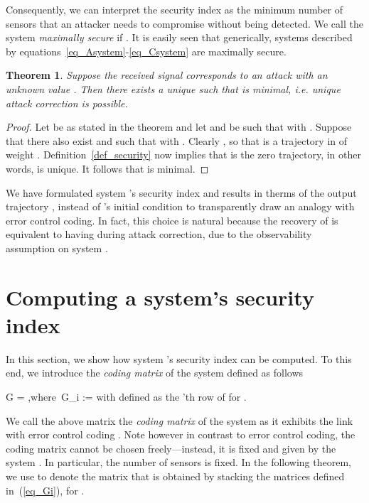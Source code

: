 \documentclass[letterpaper, 10 pt, conference]{ieeeconf}
\newcommand{\beq}{}
\newcommand{\bmat}{\left[ \begin{array}}
\newcommand{\emat}{\end{array} \right]}
\newtheorem{thm}{Theorem}[section]
\begin{document}
Consequently, we can interpret the security index  as the minimum number of sensors that an attacker needs to compromise without being detected. We call the system  {\em maximally secure} if . It is easily seen that generically, systems described by equations~\eqref{eq_Asystem}-\eqref{eq_Csystem} are maximally secure.

\begin{thm}\label{thm_correct}
Suppose the received signal  corresponds to an attack  with  an unknown value . Then there exists a unique  such that  is minimal, i.e. unique attack correction is possible.   
\end{thm}
\begin{proof}
		Let  be as stated in the theorem and let  and  be such that  with . Suppose that there also exist  and  such that  with . Clearly , so that  is a trajectory in  of weight . Definition~\ref{def_security} now implies that 
		 is the zero trajectory, in other words,  is unique.  It follows that  is minimal.
\end{proof}

We have formulated system 's security index  and results in therms of the output trajectory , instead of 's initial condition  to transparently draw an analogy with error control coding. In fact, this choice is natural because the recovery of  is equivalent to having  during attack correction, due to the observability assumption on system .

\section{Computing a system's security index}
In this section, we show how system 's security index  can be computed. To this end, we introduce the {\em coding matrix}  of the system  defined as follows 
\beq
G = \bmat{c} G_1 \\ G_2 \\ \vdots \\ G_N \emat,\;\;\;\mbox{where }G_i := \bmat{c} C_i \\
C_iA
\\
C_iA^2 \\
\vdots \\
C_iA^{n-1}
\emat\label{eq_Gi}
\eeq
with  defined as the 'th row of  for .

We call the above matrix  the {\em coding matrix} of the system as it exhibits the link with error control coding \cite{leeSE2015ECC}. Note however in contrast to error control coding, the coding matrix  cannot be chosen freely---instead, it is fixed and given by the system . In particular, the number of sensors  is fixed.  In the following theorem, we use  to denote the matrix that is obtained by stacking the matrices  defined in~(\ref{eq_Gi}), for .
\end{document}
